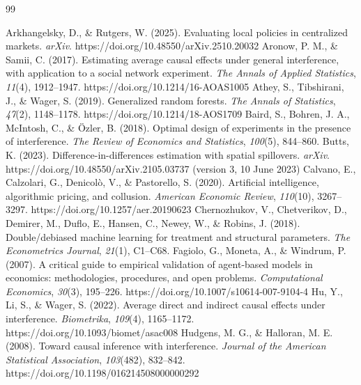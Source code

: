 \documentclass[11pt]{article}
\begin{document}
\begin{thebibliography}{99}\small\raggedright
{} Arkhangelsky, D., \& Rutgers, W. (2025). Evaluating local policies in centralized markets. \textit{arXiv}. https://doi.org/10.48550/arXiv.2510.20032
 Aronow, P. M., \& Samii, C. (2017). Estimating average causal effects under general interference, with application to a social network experiment. \textit{The Annals of Applied Statistics}, \textit{11}(4), 1912--1947. https://doi.org/10.1214/16-AOAS1005
 Athey, S., Tibshirani, J., \& Wager, S. (2019). Generalized random forests. \textit{The Annals of Statistics}, \textit{47}(2), 1148--1178. https://doi.org/10.1214/18-AOS1709
 Baird, S., Bohren, J. A., McIntosh, C., \& \"{O}zler, B. (2018). Optimal design of experiments in the presence of interference. \textit{The Review of Economics and Statistics}, \textit{100}(5), 844--860.
 Butts, K. (2023). Difference-in-differences estimation with spatial spillovers. \textit{arXiv}. https://doi.org/10.48550/arXiv.2105.03737 (version 3, 10 June 2023)
 Calvano, E., Calzolari, G., Denicol\`o, V., \& Pastorello, S. (2020). Artificial intelligence, algorithmic pricing, and collusion. \textit{American Economic Review}, \textit{110}(10), 3267--3297. https://doi.org/10.1257/aer.20190623
 Chernozhukov, V., Chetverikov, D., Demirer, M., Duflo, E., Hansen, C., Newey, W., \& Robins, J. (2018). Double/debiased machine learning for treatment and structural parameters. \textit{The Econometrics Journal}, \textit{21}(1), C1--C68.
 Fagiolo, G., Moneta, A., \& Windrum, P. (2007). A critical guide to empirical validation of agent-based models in economics: methodologies, procedures, and open problems. \textit{Computational Economics}, \textit{30}(3), 195--226. https://doi.org/10.1007/s10614-007-9104-4
 Hu, Y., Li, S., \& Wager, S. (2022). Average direct and indirect causal effects under interference. \textit{Biometrika}, \textit{109}(4), 1165--1172. https://doi.org/10.1093/biomet/asac008
 Hudgens, M. G., \& Halloran, M. E. (2008). Toward causal inference with interference. \textit{Journal of the American Statistical Association}, \textit{103}(482), 832--842. https://doi.org/10.1198/016214508000000292

\end{thebibliography}
\end{document}
